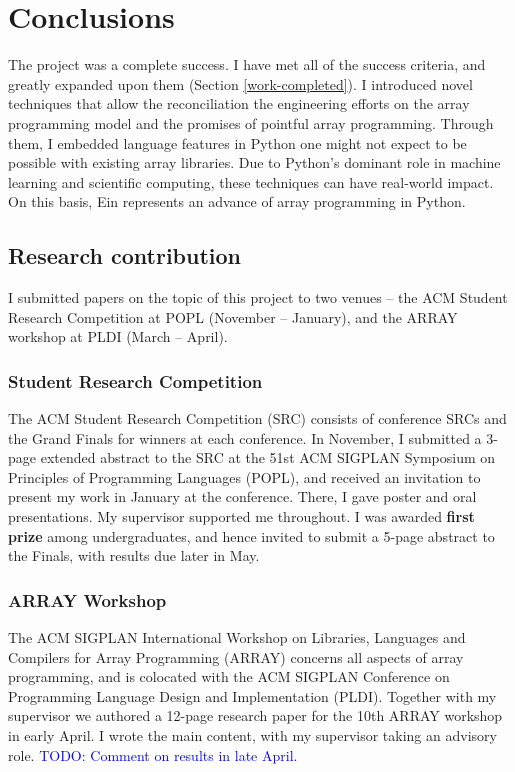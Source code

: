 \chapter{Conclusions}

The project was a complete success. 
I have met all of the success criteria, and greatly expanded upon them (Section \ref{work-completed}). 
I introduced novel techniques that allow the reconciliation the engineering efforts on the array programming model and the promises of pointful array programming. 
Through them, I embedded language features in Python one might not expect to be possible with existing array libraries. 
Due to Python's dominant role in machine learning and scientific computing, these techniques can have real-world impact. 
On this basis, Ein represents an advance of array programming in Python.

\section{Research contribution}
\label{research-contribution}

I submitted papers on the topic of this project to two venues -- the ACM Student Research Competition at POPL (November -- January), and the ARRAY workshop at PLDI (March -- April).

\subsection{Student Research Competition}

The ACM Student Research Competition (SRC) consists of conference SRCs and the Grand Finals for winners at each conference. In November, I submitted a 3-page extended abstract to the SRC at the 51st ACM SIGPLAN Symposium on Principles of Programming Languages (POPL), and received an invitation to present my work in January at the conference. 
There, I gave poster and oral presentations.
My supervisor supported me throughout.
I was awarded \textbf{first prize} among undergraduates, and hence invited to submit a 5-page abstract to the Finals, with results due later in May.

\subsection{ARRAY Workshop}

The ACM SIGPLAN International Workshop on Libraries, Languages and Compilers for Array Programming (ARRAY) concerns all aspects of array programming, and is colocated with the ACM SIGPLAN Conference on Programming Language Design and Implementation (PLDI). Together with my supervisor we authored a 12-page research paper for the 10th ARRAY workshop in early April. I wrote the main content, with my supervisor taking an advisory role. \textcolor{blue}{TODO: Comment on results in late April.}

